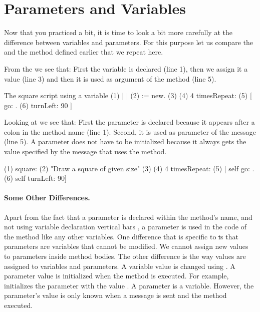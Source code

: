 \section{Parameters and Variables}
Now that you practiced a bit, it is time to look a bit more carefully at the difference between variables and parameters. For this purpose let us compare the  and the method  defined earlier that we repeat here. 

From the  we see that:  First the variable  is declared (line 1), then we assign it a value (line 3) and then it is used as argument of the method \go (line 5).

\begin{scriptwithtitle}{The square script using a variable}\label{scr:Argsquarewithvariable}
(1)   | \caro {} | 
(2)   \caro := \Turtle new.
(3)   
(4)   4 timesRepeat: 
(5)               [ \caro go: .
(6)               \caro turnLeft: 90 ]
\end{scriptwithtitle}

Looking at  we see that:
First the parameter  is declared because it appears after
a colon in the method name (line 1). Second, it is used
as parameter of the message \go (line 5). A parameter does not have to be initialized because it always gets the value specified by the message that uses the method.

\begin{method}\label{mth:squareArgumentsagain}
(1) square: 
(2)   "Draw a square of given size"
(3)
(4)   4 timesRepeat: 
(5)                    [ self go: .
(6)                    self turnLeft: 90]
\end{method}

\paragraph{Some Other Differences.}
Apart from the fact that a parameter is declared within the method's name, and not using variable declaration vertical bars \ct{||}, a parameter is used in the code of the method like any other variables. One difference that is specific to \st is that parameters are variables that cannot be modified. We cannot assign new values to parameters inside method bodies. The other difference is the way values are assigned to variables and parameters. A variable value is changed using \ct{:=}.  A parameter value is initialized when the method is executed. For example,  initializes the parameter  with the value . A parameter is a variable. However, the  parameter's value is only known when a message is sent and the method executed.

